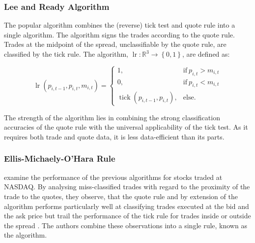 \subsubsection{Lee and Ready Algorithm}\label{sec:lee-and-ready-algorithm}

The popular  algorithm \autocite{leeInferringTradeDirection1991} combines the (reverse) tick test and quote rule into a single algorithm. The algorithm signs the trades according to the quote rule. Trades at the midpoint of the spread, unclassifiable by the quote rule, are classified by the tick rule. The  algorithm, $\operatorname{lr} \colon \mathbb{R}^3 \to \left\{0,1\right\}$, are defined as:

\begin{equation}
  \operatorname{lr}(p_{i,t-1}, p_{i,t}, m_{i,t})=
  \begin{cases}
    1,                                       & \text{if}\ p_{i, t} > m_{i, t} \\
    0,                                       & \text{if}\ p_{i, t} < m_{i, t} \\
    \operatorname{tick}(p_{i,t-1}, p_{i,t}), & \text{else}.
  \end{cases}
\end{equation}

The strength of the algorithm lies in combining the strong classification accuracies of the quote rule with the universal applicability of the tick test. As it requires both trade and quote data, it is less data-efficient than its parts.


\subsubsection{Ellis-Michaely-O'Hara
  Rule}\label{sec:ellis-michaely-ohara-rule}

\textcite[][536]{ellisAccuracyTradeClassification2000} examine the performance of the previous algorithms for stocks traded at NASDAQ. By analysing miss-classified trades with regard to the proximity of the trade to the quotes, they observe, that the quote rule and by extension of the  algorithm performs particularly well at classifying trades executed at the bid and the ask price but trail the performance of the tick rule for trades inside or outside the spread \autocite[][535--536]{ellisAccuracyTradeClassification2000}. The authors combine these observations into a single rule, known as the  algorithm.

